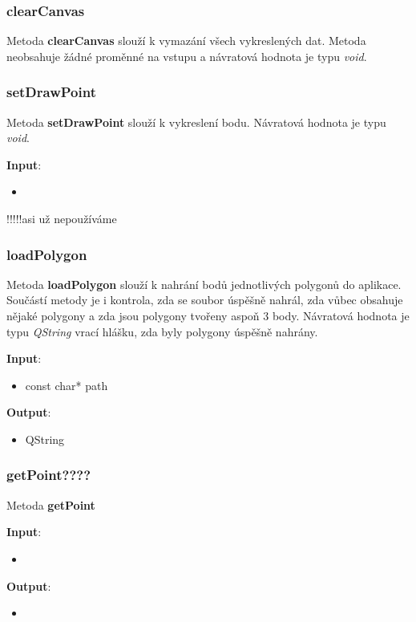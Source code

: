 \documentclass[a4paper, 12pt]{article}
\begin{document}
\subsubsection{clearCanvas}
Metoda \textbf{clearCanvas} slouží k vymazání všech vykreslených dat. Metoda neobsahuje žádné proměnné na vstupu a návratová hodnota je typu \textsl{void}.

\subsubsection{setDrawPoint}
Metoda \textbf{setDrawPoint} slouží k vykreslení bodu. Návratová hodnota je typu \textsl{void}.

\textbf{Input}:
\begin{itemize}
\item 
\end{itemize}
!!!!!asi už nepoužíváme

\subsubsection{loadPolygon}
Metoda \textbf{loadPolygon} slouží k nahrání bodů jednotlivých polygonů do aplikace.  Součástí metody je i kontrola, zda se soubor úspěšně nahrál, zda vůbec obsahuje nějaké polygony a zda jsou polygony tvořeny aspoň 3 body. Návratová hodnota je typu \textsl{QString} vrací hlášku, zda byly polygony úspěšně nahrány.

\textbf{Input}:
\begin{itemize}
\item const char* path
\end{itemize}

\textbf{Output}:
\begin{itemize}
\item QString
\end{itemize}

\subsubsection{getPoint????}
Metoda \textbf{getPoint}

\textbf{Input}:
\begin{itemize}
\item 
\end{itemize}

\textbf{Output}:
\begin{itemize}
\item 
\end{itemize}
\end{document}
